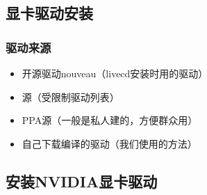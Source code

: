 \subsection{显卡驱动安装}
\subsubsection{驱动来源}
\begin{itemize}
\item 开源驱动nouveau（livecd安装时用的驱动）
\item 源（受限制驱动列表）
\item PPA源（一般是私人建的，方便群众用）
\item 自己下载编译的驱动（我们使用的方法）
\end{itemize}

\subsection{安装NVIDIA显卡驱动}
